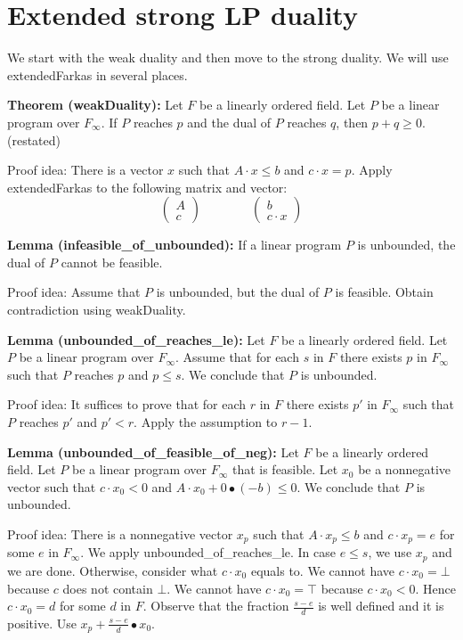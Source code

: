 \documentclass[]{article}
\renewcommand{\.}{\hskip .75pt}
\let\*=\cdot
\begin{document}
\section {Extended strong LP duality}

We start with the weak duality and then move to the strong duality.
We will use extendedFarkas in several places.

\medskip \noindent
\textbf{Theorem (weakDuality):}
Let $F$ be a linearly ordered field.
Let $P$ be a linear program over $F_\infty$.
If $P$ reaches $p$ and the dual of $P$ reaches $q$,
then $p + q \ge 0$.
(restated)

\medskip \noindent
Proof idea:
There is a vector $x$ such that $A \* x \le b$ and $c \* x = p$.
Apply extendedFarkas to the following matrix and vector:
$$
\begin{pmatrix}
A \\
c
\end{pmatrix}
\qquad \qquad
\begin{pmatrix}
b \\
c \* x
\end{pmatrix}
$$

\medskip \noindent
\textbf{Lemma (infeasible\_of\_unbounded):}
If a linear program $P$ is unbounded,
the dual of $P$ cannot be feasible.

\medskip \noindent
Proof idea:
Assume that $P$ is unbounded, but the dual of $P$ is feasible.
Obtain contradiction using weakDuality.

\medskip \noindent
\textbf{Lemma (unbounded\_of\_reaches\_le):}
Let $F$ be a linearly ordered field.
Let $P$ be a linear program over $F_\infty$.
Assume that for each $s$ in $F$ there exists
$p$ in $F_\infty$ such that $P$ reaches $p$
and $p \le s$.
We conclude that $P$ is unbounded.

\medskip \noindent
Proof idea:
It suffices to prove that for each $r$ in $F$ there exists
$p'$ in $F_\infty$ such that $P$ reaches $p'$ and $p' < r$.
Apply the assumption to $r\!-\!1$.

\medskip \noindent
\textbf{Lemma (unbounded\_of\_feasible\_of\_neg):}
Let $F$ be a linearly ordered field.
Let $P$ be a linear program over $F_\infty$ that is feasible.
Let $x_0$ be a nonnegative vector such that $c \cdot x_0 < 0$
and $A \cdot x_0 + 0 \bullet (-b) \le 0$.
We conclude that $P$ is unbounded.

\medskip \noindent
Proof idea:
There is a nonnegative vector $x_p$ such that $A \* x_p \le b$ and
$c \* x_p = e$ for some $e$ in $F_\infty$.
We apply unbounded\_of\_reaches\_le.
In case $e \le s$, we use $x_p$ and we are done.
Otherwise, consider what $c \cdot x_0$ equals to.
We cannot have $c \cdot x_0 = \bot$ because $c$ does not contain $\bot$.
We cannot have $c \cdot x_0 = \top$ because $c \cdot x_0 < 0$.
Hence $c \cdot x_0 = d$ for some $d$ in $F$.
Observe that the fraction $\frac{s-e}{d}$ is
well defined and it is positive.
Use $x_p + \frac{s-e}{d} \bullet x_0$.
\end{document}
